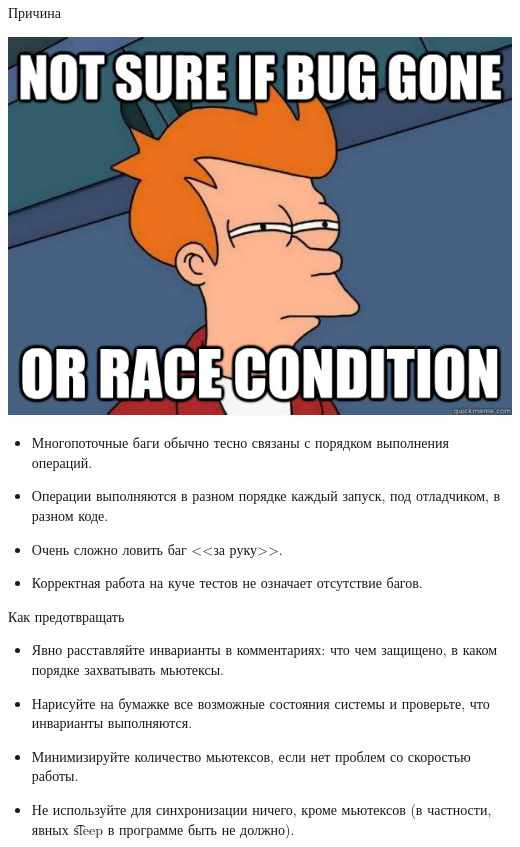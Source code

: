 \begin{frame}{Причина}
	\begin{center}
		\includegraphics[scale=0.2]{race-or-bug.jpg}
	\end{center}
	\begin{itemize}
		\item Многопоточные баги обычно тесно связаны с порядком выполнения операций.
		\item Операции выполняются в разном порядке каждый запуск, под отладчиком, в разном коде.
		\item Очень сложно ловить баг <<за руку>>.
		\item Корректная работа на куче тестов не означает отсутствие багов.
	\end{itemize}
\end{frame}

\begin{frame}{Как предотвращать}
	\begin{itemize}
		\item Явно расставляйте инварианты в комментариях: что чем защищено, в каком порядке захватывать мьютексы.
		\item Нарисуйте на бумажке все возможные состояния системы и проверьте, что инварианты выполняются.
		\item Минимизируйте количество мьютексов, если нет проблем со скоростью работы.
		\item Не используйте для синхронизации ничего, кроме мьютексов (в частности, явных \t{sleep} в программе быть не должно).
	\end{itemize}
\end{frame}


